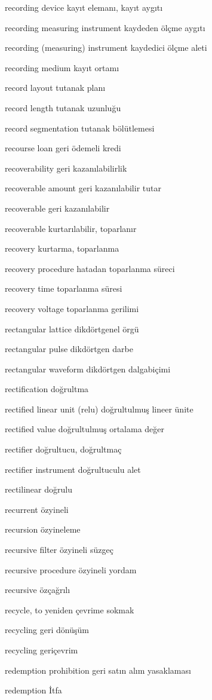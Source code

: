 \documentclass[12pt,fleqn]{article}\usepackage{../../common}
\begin{document}
recording device kayıt elemanı, kayıt aygıtı

recording measuring instrument kaydeden ölçme aygıtı

recording (measuring) instrument kaydedici ölçme aleti

recording medium kayıt ortamı

record layout tutanak planı

record length tutanak uzunluğu

record segmentation tutanak bölütlemesi

recourse loan geri ödemeli kredi

recoverability geri kazanılabilirlik

recoverable amount geri kazanılabilir tutar

recoverable geri kazanılabilir

recoverable kurtarılabilir, toparlanır

recovery kurtarma, toparlanma

recovery procedure hatadan toparlanma süreci

recovery time toparlanma süresi

recovery voltage toparlanma gerilimi

rectangular lattice dikdörtgenel örgü

rectangular pulse dikdörtgen darbe

rectangular waveform dikdörtgen dalgabiçimi

rectification doğrultma

rectified linear unit (relu) doğrultulmuş lineer ünite

rectified value doğrultulmuş ortalama değer

rectifier doğrultucu, doğrultmaç

rectifier instrument doğrultuculu alet

rectilinear doğrulu

recurrent özyineli

recursion özyineleme

recursive filter özyineli süzgeç

recursive procedure özyineli yordam

recursive özçağrılı

recycle, to yeniden çevrime sokmak

recycling geri dönüşüm

recycling geriçevrim

redemption prohibition geri satın alım yasaklaması

redemption İtfa
\end{document}
